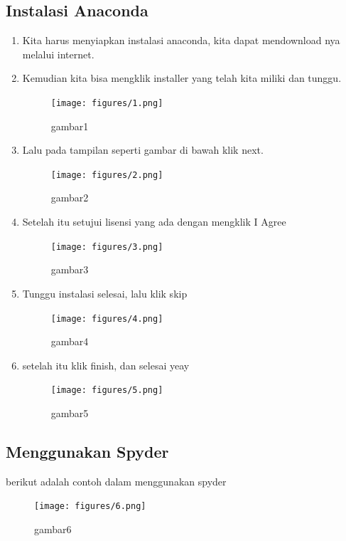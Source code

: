 \subsection{Instalasi Anaconda}
\begin{enumerate}
    \item Kita harus menyiapkan instalasi anaconda, kita dapat mendownload nya melalui internet.
    \item Kemudian kita bisa mengklik installer yang telah kita miliki dan tunggu.
    \begin{figure}[!htbp]
        \centering
        \texttt{[image: figures/1.png]}
        \caption{gambar1}
        \label{awal}
        \end{figure}

    \item Lalu pada tampilan seperti gambar di bawah klik next.
    \begin{figure}[!htbp]
        \centering
        \texttt{[image: figures/2.png]}
        \caption{gambar2}
        \label{next}
        \end{figure}

    \item Setelah itu setujui lisensi yang ada dengan mengklik I Agree
    \begin{figure}[!htbp]
        \centering
        \texttt{[image: figures/3.png]}
        \caption{gambar3}
        \label{lisensi}
        \end{figure}

    \item Tunggu instalasi selesai, lalu klik skip
    \begin{figure}[!htbp]
        \centering
        \texttt{[image: figures/4.png]}
        \caption{gambar4}
        \label{skip}
        \end{figure}

    \item setelah itu klik finish, dan selesai yeay
    \begin{figure}[!htbp]
        \centering
        \texttt{[image: figures/5.png]}
        \caption{gambar5}
        \label{selesai}
        \end{figure}
\end{enumerate}

\subsection{Menggunakan Spyder}
berikut adalah contoh dalam menggunakan spyder
\begin{figure}[!htbp]
    \centering
    \texttt{[image: figures/6.png]}
    \caption{gambar6}
    \label{spyder}
    \end{figure}
